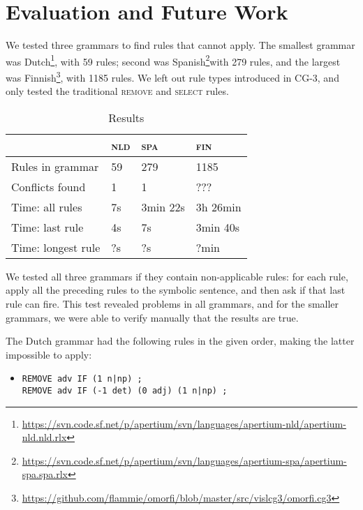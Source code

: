 \section{Evaluation and Future Work}
\label{sec:eval}

We tested three grammars to find rules that cannot apply. The smallest grammar was Dutch\footnote{\url{https://svn.code.sf.net/p/apertium/svn/languages/apertium-nld/apertium-nld.nld.rlx}}, with 59 rules; second was Spanish\footnote{\url{https://svn.code.sf.net/p/apertium/svn/languages/apertium-spa/apertium-spa.spa.rlx}}with 279 rules, and the largest was Finnish\footnote{\url{https://github.com/flammie/omorfi/blob/master/src/vislcg3/omorfi.cg3}}, with 1185 rules. We left out rule types introduced in CG-3, and only tested the traditional \textsc{remove} and \textsc{select} rules.

\begin{table}[]
\centering
\begin{tabular}{|l|l|l|l|}
\hline
                      & \textsc{nld}  & \textsc{spa}  & \textsc{fin}  \\ \hline
Rules in grammar      & 59              & 279               & 1185     \\ \hline
Conflicts found       & 1               & 1                 & ???    \\ \hline
Time: all rules       & 7s              & 3min 22s          & 3h 26min    \\ \hline
Time: last rule       & 4s              & 7s                & 3min 40s    \\ \hline
Time: longest rule    & ?s              & ?s                & ?min     \\ \hline

\end{tabular}
\caption{Results}
\label{table:res}
\end{table}

We tested all three grammars if they contain non-applicable rules:
for each rule, apply all the preceding rules to the symbolic sentence, and then ask if that last rule can fire.
This test revealed problems in all grammars, and for the smaller grammars, we were able to verify manually that the results are true.

The Dutch grammar had the following rules in the given order, making the latter impossible to apply:

\begin{itemize}
\item[] 
\begin{verbatim}REMOVE adv IF (1 n|np) ;
REMOVE adv IF (-1 det) (0 adj) (1 n|np) ;
\end{verbatim}
\end{itemize}

